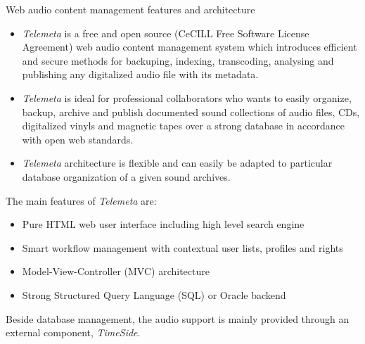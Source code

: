 \documentclass[final, hyperref, table]{beamer}
\begin{document}
\begin{frame}[containsverbatim]{}
\begin{columns}[T]
\begin{column}[T]{.49\linewidth}
      \begin{block}{Web audio content management features and architecture}
        \vspace{-0.5cm}  
        \begin{itemize}
        \item \emph{Telemeta} is a free and open source ({\scriptsize CeCILL
            Free Software License Agreement}) web audio content management
          system which introduces efficient and secure methods for
          \alert{backuping}, \alert{indexing}, \alert{transcoding}, \alert{analysing} and \alert{publishing} any
          digitalized audio file with its metadata.
        \item \emph{Telemeta} is ideal for
          professional collaborators who wants to easily organize, backup, archive and
          publish documented sound collections of audio files, CDs,
          digitalized vinyls and magnetic tapes over a strong database in
          accordance with \alert{open web standards}.
        \item \emph{Telemeta} architecture
          is \alert{flexible} and can easily be adapted to particular database
          organization of a given sound archives.
        \end{itemize}
        
        The main features of \emph{Telemeta} are:
        \vspace{-0.1cm}
        \begin{itemize}
        \item \alert{Pure HTML} web user interface including high level \alert{search engine}
        \item \alert{Smart workflow management} with contextual user lists, profiles and rights
        \item Model-View-Controller (\alert{MVC}) architecture 
        \item Strong Structured Query Language (\alert{SQL}) or Oracle backend
        \end{itemize}
        Beside database management, the audio support is mainly provided through an external component, \emph{TimeSide}.
        

\end{block}
\end{column}
\end{columns}
\end{frame}
\end{document}
